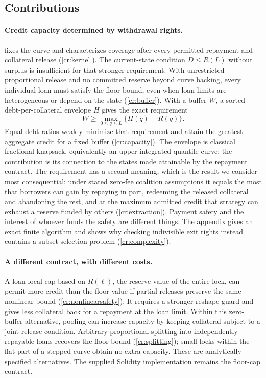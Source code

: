 \subsection{Contributions}

\paragraph{Credit capacity determined by withdrawal rights.}
 fixes the curve and characterizes coverage after every permitted repayment and collateral release (\cref{cr:kernel}). The current-state condition $D\le R(L)$ without surplus is insufficient for that stronger requirement. With unrestricted proportional release and no committed reserve beyond curve backing, every individual loan must satisfy the floor bound, even when loan limits are heterogeneous or depend on the state (\cref{cr:buffer}). With a buffer $W$, a sorted debt-per-collateral envelope $H$ gives the exact requirement
\[
W\ge\max_{0\le q\le L}\{H(q)-R(q)\}.
\]
Equal debt ratios weakly minimize that requirement and attain the greatest aggregate credit for a fixed buffer (\cref{cr:capacity}). The envelope is classical fractional knapsack, equivalently an upper integrated-quantile curve; the contribution is its connection to the states made attainable by the repayment contract. The requirement has a second meaning, which is the result we consider most consequential: under stated zero-fee coalition assumptions it equals the most that borrowers can gain by repaying in part, redeeming the released collateral and abandoning the rest, and at the maximum admitted credit that strategy can exhaust a reserve funded by others (\cref{cr:extraction}). Payment safety and the interest of whoever funds the safety are different things. The appendix gives an exact finite algorithm and shows why checking indivisible exit rights instead contains a subset-selection problem (\cref{cr:complexity}).

\paragraph{A different contract, with different costs.}
A loan-local cap based on $R(\ell)$, the reserve value of the entire lock, can permit more credit than the floor value if partial releases preserve the same nonlinear bound (\cref{cr:nonlinearsafety}). It requires a stronger reshape guard and gives less collateral back for a repayment at the loan limit. Within this zero-buffer alternative, pooling can increase capacity by keeping collateral subject to a joint release condition. Arbitrary proportional splitting into independently repayable loans recovers the floor bound (\cref{cr:splitting}); small locks within the flat part of a stepped curve obtain no extra capacity. These are analytically specified alternatives. The supplied Solidity implementation remains the floor-cap contract.

